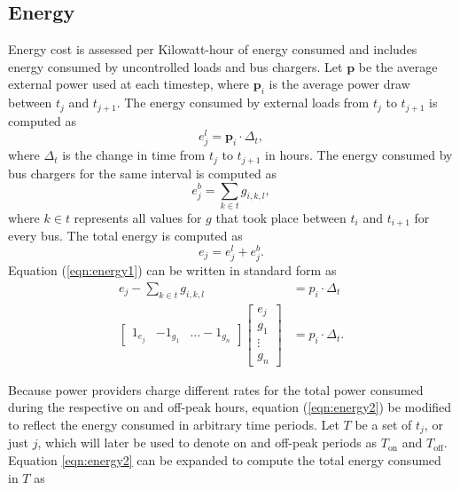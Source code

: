 \subsection{Energy}
\par Energy cost is assessed per Kilowatt-hour of energy consumed and includes energy consumed by uncontrolled loads and bus chargers. Let $\mathbf{p}$ be the average external power used at each timestep, where $\mathbf{p}_i$ is the average power draw between $t_j$ and $t_{j + 1}$. The energy consumed by external loads from $t_j$ to $t_{j+1}$ is computed as 
\begin{equation}
	e^l_j = \mathbf{p}_i \cdot \Delta_t,
\end{equation}
where $\Delta_t$ is the change in time from $t_j$ to $t_{j+1}$ in hours. The energy consumed by bus chargers for the same interval is computed as  
\begin{equation}
	e^b_j = \sum_{k\in t}g_{i,k,l},	
\end{equation}
where $k\in t$ represents all values for $g$ that took place between $t_i$ and $t_{i+1}$ for every bus.
The total energy is computed as 
\begin{equation}\label{eqn:energy1}
	e_j = e^l_j + e^b_j.
\end{equation}
Equation (\ref{eqn:energy1}) can be written in standard form as 
\begin{equation}\label{eqn:energy2}
	\begin{aligned}
		e_j -\sum_{k\in t}g_{i,k,l} &= p_i \cdot \Delta_t \\
		\begin{bmatrix} 1_{e_j} & -1_{g_1} & \hdots -1_{g_n} \end{bmatrix} \begin{bmatrix}e_j \\ g_1 \\ \vdots \\ g_n \end{bmatrix} &= p_i \cdot \Delta_t.
	\end{aligned}
\end{equation}
\par Because power providers charge different rates for the total power consumed during the respective on and off-peak hours,  equation (\ref{eqn:energy2}) be modified to reflect the energy consumed in arbitrary time periods.  Let $T$ be a set of $t_j$, or just $j$, which will later be used to denote on and off-peak periods as $T_{\text{on}}$ and $T_{\text{off}}$. Equation \ref{eqn:energy2} can be expanded to compute the total energy consumed in $T$ as
